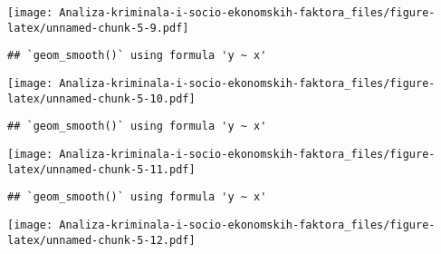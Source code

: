 \documentclass[
]{article}
\begin{document}
\texttt{[image: Analiza-kriminala-i-socio-ekonomskih-faktora\_files/figure-latex/unnamed-chunk-5-9.pdf]}

\begin{verbatim}
## `geom_smooth()` using formula 'y ~ x'
\end{verbatim}

\texttt{[image: Analiza-kriminala-i-socio-ekonomskih-faktora\_files/figure-latex/unnamed-chunk-5-10.pdf]}

\begin{verbatim}
## `geom_smooth()` using formula 'y ~ x'
\end{verbatim}

\texttt{[image: Analiza-kriminala-i-socio-ekonomskih-faktora\_files/figure-latex/unnamed-chunk-5-11.pdf]}

\begin{verbatim}
## `geom_smooth()` using formula 'y ~ x'
\end{verbatim}

\texttt{[image: Analiza-kriminala-i-socio-ekonomskih-faktora\_files/figure-latex/unnamed-chunk-5-12.pdf]}
\end{document}
